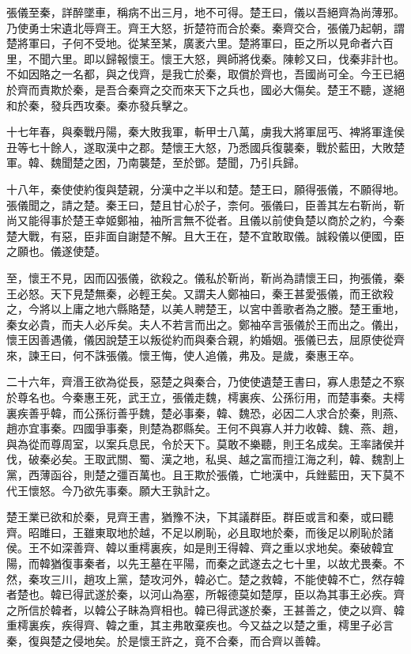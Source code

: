 張儀至秦，詳醉墜車，稱病不出三月，地不可得。楚王曰，儀以吾絕齊為尚薄邪。乃使勇士宋遺北辱齊王。齊王大怒，折楚符而合於秦。秦齊交合，張儀乃起朝，謂楚將軍曰，子何不受地。從某至某，廣袤六里。楚將軍曰，臣之所以見命者六百里，不聞六里。即以歸報懷王。懷王大怒，興師將伐秦。陳軫又曰，伐秦非計也。不如因賂之一名都，與之伐齊，是我亡於秦，取償於齊也，吾國尚可全。今王已絕於齊而責欺於秦，是吾合秦齊之交而來天下之兵也，國必大傷矣。楚王不聽，遂絕和於秦，發兵西攻秦。秦亦發兵擊之。

十七年春，與秦戰丹陽，秦大敗我軍，斬甲士八萬，虜我大將軍屈丐、裨將軍逢侯丑等七十餘人，遂取漢中之郡。楚懷王大怒，乃悉國兵復襲秦，戰於藍田，大敗楚軍。韓、魏聞楚之困，乃南襲楚，至於鄧。楚聞，乃引兵歸。

十八年，秦使使約復與楚親，分漢中之半以和楚。楚王曰，願得張儀，不願得地。張儀聞之，請之楚。秦王曰，楚且甘心於子，柰何。張儀曰，臣善其左右靳尚，靳尚又能得事於楚王幸姬鄭袖，袖所言無不從者。且儀以前使負楚以商於之約，今秦楚大戰，有惡，臣非面自謝楚不解。且大王在，楚不宜敢取儀。誠殺儀以便國，臣之願也。儀遂使楚。

至，懷王不見，因而囚張儀，欲殺之。儀私於靳尚，靳尚為請懷王曰，拘張儀，秦王必怒。天下見楚無秦，必輕王矣。又謂夫人鄭袖曰，秦王甚愛張儀，而王欲殺之，今將以上庸之地六縣賂楚，以美人聘楚王，以宮中善歌者為之媵。楚王重地，秦女必貴，而夫人必斥矣。夫人不若言而出之。鄭袖卒言張儀於王而出之。儀出，懷王因善遇儀，儀因說楚王以叛從約而與秦合親，約婚姻。張儀已去，屈原使從齊來，諫王曰，何不誅張儀。懷王悔，使人追儀，弗及。是歲，秦惠王卒。

二十六年，齊湣王欲為從長，惡楚之與秦合，乃使使遺楚王書曰，寡人患楚之不察於尊名也。今秦惠王死，武王立，張儀走魏，樗裏疾、公孫衍用，而楚事秦。夫樗裏疾善乎韓，而公孫衍善乎魏，楚必事秦，韓、魏恐，必因二人求合於秦，則燕、趙亦宜事秦。四國爭事秦，則楚為郡縣矣。王何不與寡人并力收韓、魏、燕、趙，與為從而尊周室，以案兵息民，令於天下。莫敢不樂聽，則王名成矣。王率諸侯并伐，破秦必矣。王取武關、蜀、漢之地，私吳、越之富而擅江海之利，韓、魏割上黨，西薄函谷，則楚之彊百萬也。且王欺於張儀，亡地漢中，兵銼藍田，天下莫不代王懷怒。今乃欲先事秦。願大王孰計之。

楚王業已欲和於秦，見齊王書，猶豫不決，下其議群臣。群臣或言和秦，或曰聽齊。昭雎曰，王雖東取地於越，不足以刷恥，必且取地於秦，而後足以刷恥於諸侯。王不如深善齊、韓以重樗裏疾，如是則王得韓、齊之重以求地矣。秦破韓宜陽，而韓猶復事秦者，以先王墓在平陽，而秦之武遂去之七十里，以故尤畏秦。不然，秦攻三川，趙攻上黨，楚攻河外，韓必亡。楚之救韓，不能使韓不亡，然存韓者楚也。韓已得武遂於秦，以河山為塞，所報德莫如楚厚，臣以為其事王必疾。齊之所信於韓者，以韓公子眛為齊相也。韓已得武遂於秦，王甚善之，使之以齊、韓重樗裏疾，疾得齊、韓之重，其主弗敢棄疾也。今又益之以楚之重，樗里子必言秦，復與楚之侵地矣。於是懷王許之，竟不合秦，而合齊以善韓。

